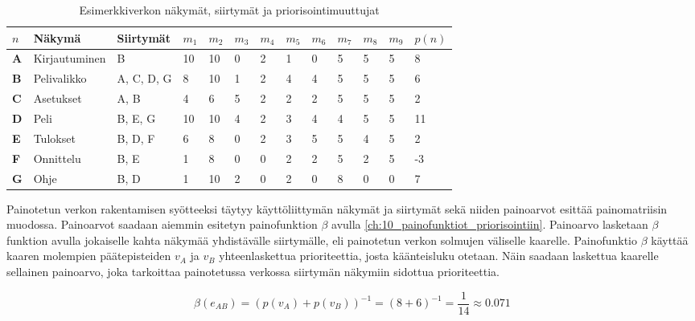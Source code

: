   \begin{table}[H]
    \caption{Esimerkkiverkon näkymät, siirtymät ja priorisointimuuttujat}
    \label{tab:esimerkki_verkon_priorisointi_muuttujat}
    \centering
    \begin{tabular}{lllllllllllll} \hline
    \(n\) & \textbf{Näkymä} & \textbf{Siirtymät} & \(m_1\) & \(m_2\) & \(m_3\) & \(m_4\) & \(m_5\) & \(m_6\) & \(m_7\) & \(m_8\) & \(m_9\) & \(p(n)\) \\ \hline
    \textbf{A} & Kirjautuminen & B & 10 & 10 & 0 & 2 & 1 & 0 & 5 & 5 & 5 & 8 \\
    \textbf{B} & Pelivalikko & A, C, D, G & 8 & 10 & 1 & 2 & 4 & 4 & 5 & 5 & 5 & 6 \\
    \textbf{C} & Asetukset & A, B & 4 & 6 & 5 & 2 & 2 & 2 & 5 & 5 & 5 & 2 \\
    \textbf{D} & Peli & B, E, G & 10 & 10 & 4 & 2 & 3 & 4 & 4 & 5 & 5 & 11 \\
    \textbf{E} & Tulokset & B, D, F & 6 & 8 & 0 & 2 & 3 & 5 & 5 & 4 & 5 & 2 \\
    \textbf{F} & Onnittelu & B, E & 1 & 8 & 0 & 0 & 2 & 2 & 5 & 2 & 5 & -3 \\
    \textbf{G} & Ohje & B, D & 1 & 10 & 2 & 0 & 2 & 0 & 8 & 0 & 0 & 7 \\ \hline
    \end{tabular}
  \end{table}

  Painotetun verkon rakentamisen syötteeksi täytyy käyttöliittymän näkymät ja siirtymät sekä niiden painoarvot esittää painomatriisin muodossa.
  Painoarvot saadaan aiemmin esitetyn painofunktion \(\beta\) avulla \ref{ch:10_painofunktiot_priorisointiin}.
  Painoarvo lasketaan \(\beta\) funktion avulla jokaiselle kahta näkymää yhdistävälle siirtymälle, eli painotetun verkon solmujen väliselle kaarelle.
  Painofunktio \(\beta\) käyttää kaaren molempien päätepisteiden \(v_A\) ja \(v_B\) yhteenlaskettua prioriteettia, josta käänteisluku otetaan.
  Näin saadaan laskettua kaarelle sellainen painoarvo, joka tarkoittaa painotetussa verkossa siirtymän näkymiin sidottua prioriteettia.

  \[\beta(e_{AB}) = (p(v_A) + p(v_B))^{-1} = (8 + 6)^{-1} = \frac{1}{14} \approx 0.071\]


